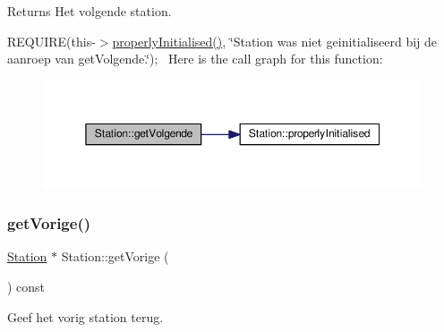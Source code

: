 \begin{DoxyReturn}{Returns}
Het volgende station.
\end{DoxyReturn}
R\+E\+Q\+U\+I\+RE(this-\/$>$\hyperlink{class_station_a9ce626dd0599e3ea8107404a59c21e16}{properly\+Initialised()}, \char`\"{}\+Station was niet geinitialiseerd bij de aanroep van get\+Volgende.\char`\"{});~\newline
Here is the call graph for this function\+:\nopagebreak
\begin{figure}[H]
\begin{center}
\leavevmode
\includegraphics[width=350pt]{class_station_a330c297adddcbfd5d8871075291e9512_cgraph}
\end{center}
\end{figure}
\mbox{\label{class_station_a69c0539e899ff540c38eb434a69bfa9e}} 
\subsubsection{\texorpdfstring{get\+Vorige()}{getVorige()}}
{\footnotesize\ttfamily \hyperlink{class_station}{Station} $\ast$ Station\+::get\+Vorige (\begin{DoxyParamCaption}{ }\end{DoxyParamCaption}) const}



Geef het vorig station terug. 


